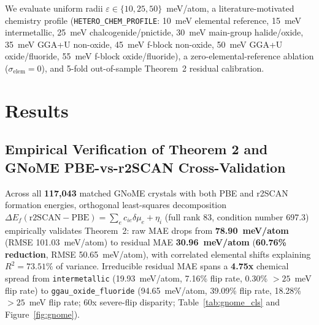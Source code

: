 \documentclass[11pt,a4paper]{article}
\newcommand{\br}{\allowbreak{}}
\begin{document}
We evaluate uniform radii $\varepsilon \in \{10, 25, 50\}$~meV/atom, a literature-motivated chemistry profile (\texttt{HETERO\_\br{}CHEM\_\br{}PROFILE}: 10~meV elemental reference, 15~meV intermetallic, 25~meV chalcogenide/pnictide, 30~meV main-group halide/oxide, 35~meV GGA+U non-oxide, 45~meV f-block non-oxide, 50~meV GGA+U oxide/fluoride, 55~meV f-block oxide/fluoride), a zero-elemental-reference ablation ($\sigma_{\mathrm{elem}} = 0$), and 5-fold out-of-sample Theorem~2 residual calibration.

\section{Results}

\subsection{Empirical Verification of Theorem 2 and GNoME PBE-vs-r2SCAN Cross-Validation}
Across all \textbf{117,043} matched GNoME crystals with both PBE and r2SCAN formation energies, orthogonal least-squares decomposition $\Delta E_f(\mathrm{r2SCAN}-\mathrm{PBE}) = \sum_e c_{ie}\delta\mu_e + \eta_i$ (full rank 83, condition number 697.3) empirically validates Theorem~2: raw MAE drops from \textbf{78.90~meV/atom} (RMSE 101.03~meV/atom) to residual MAE \textbf{30.96~meV/atom} (\textbf{60.76\% reduction}, RMSE 50.65~meV/atom), with correlated elemental shifts explaining $R^2 = 73.51\%$ of variance. Irreducible residual MAE spans a \textbf{4.75x} chemical spread from \texttt{intermetallic} (19.93~meV/atom, 7.16\% flip rate, 0.30\% $>25$~meV flip rate) to \texttt{ggau\_\br{}oxide\_\br{}fluoride} (94.65~meV/atom, 39.09\% flip rate, 18.28\% $>25$~meV flip rate; 60x severe-flip disparity; Table~\ref{tab:gnome_cls} and Figure~\ref{fig:gnome}).
\end{document}
